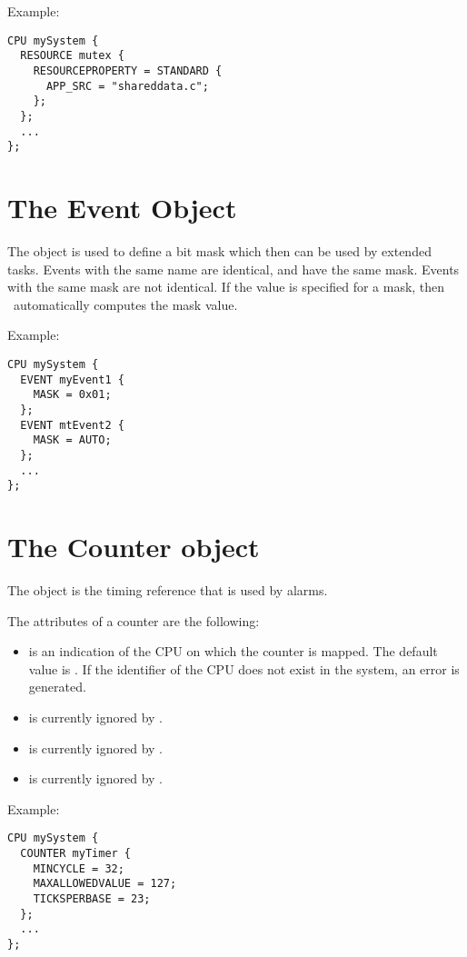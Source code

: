 Example:

\begin{lstlisting}
CPU mySystem {
  RESOURCE mutex {
    RESOURCEPROPERTY = STANDARD {
      APP_SRC = "shareddata.c";
    };
  };
  ...
};
\end{lstlisting}

\section{The Event Object}
The  object is used to define a bit mask which
then can be used by extended tasks. Events with the same name are
identical, and have the same mask. Events with the same mask are not
identical. If the value  is specified for a mask, then
\rtd\ automatically computes the mask value.

Example:

\begin{lstlisting}
CPU mySystem {
  EVENT myEvent1 {
    MASK = 0x01;
  };
  EVENT mtEvent2 {
    MASK = AUTO;
  };
  ...
};
\end{lstlisting}



\section{The Counter object}
\label{sec:counter-extensions}

The  object is the timing reference that is used by alarms.

The attributes of a counter are the following:
\begin{itemize}
\item {} is an indication
  of the CPU on which the counter is mapped. The default value is
  . If the identifier of the CPU does not exist in
  the system, an error is generated.
\item {} is currently ignored by \ee.
\item {} is currently ignored by \ee.
\item {} is currently ignored by \ee.
%
%
\end{itemize}

Example:

\begin{lstlisting}
CPU mySystem {
  COUNTER myTimer {
    MINCYCLE = 32;
    MAXALLOWEDVALUE = 127;
    TICKSPERBASE = 23;
  };
  ...
};
\end{lstlisting}


